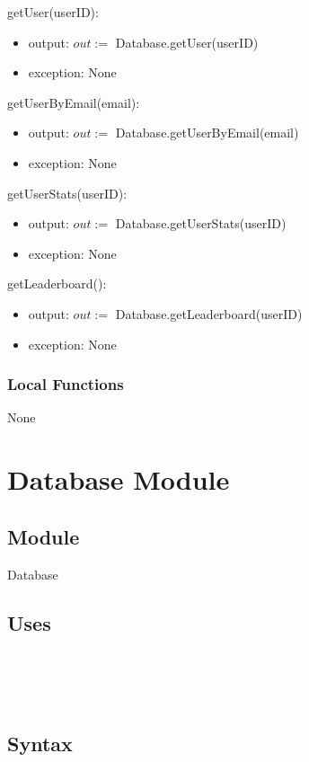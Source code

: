 \documentclass[12pt, titlepage]{article}
\begin{document}
\noindent getUser(userID):
\begin{itemize}
\item output:  $out := $ Database.getUser(userID)
\item exception: None
\end{itemize}


\noindent getUserByEmail(email):
\begin{itemize}
\item output:  $out := $ Database.getUserByEmail(email)
\item exception: None
\end{itemize}

\noindent getUserStats(userID):
\begin{itemize}
\item output:  $out := $ Database.getUserStats(userID)
\item exception: None
\end{itemize}


\noindent getLeaderboard():
\begin{itemize}
\item output:  $out := $ Database.getLeaderboard(userID)
\item exception: None
\end{itemize}


\subsubsection{Local Functions}
None

\newpage
\section{Database Module} \label{Database} 

\subsection{Module}

Database

\subsection{Uses}

\\
\\
\\

\subsection{Syntax}
\end{document}
